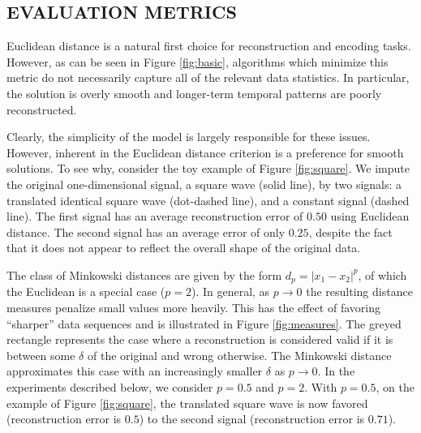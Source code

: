 \documentclass{article}
\newcommand{\FIXME}[2][FIXME]{\textcolor{blue}{\textbf{#1}: \emph{#2}}}
\begin{document}


\subsection{EVALUATION METRICS}
\label{ssec:measures}
Euclidean distance is a natural first choice for reconstruction and
encoding tasks. However, as can be seen in Figure \ref{fig:basic},
algorithms which minimize this metric do not necessarily capture all
of the relevant data statistics.  In particular, the solution is
overly smooth and longer-term temporal patterns are poorly
reconstructed.

Clearly, the simplicity of the model is largely responsible for these
issues.  However, inherent in the Euclidean distance criterion is a
preference for smooth solutions.
To see why, consider the toy example of Figure \ref{fig:square}. We
impute the original one-dimensional signal, a square wave (solid
line), by two signals: a translated identical square wave (dot-dashed
line), and a constant signal (dashed line). The first signal has an
average reconstruction error of $0.50$ using Euclidean distance. The
second signal has an average error of only $0.25$, despite the fact
that it does not appear to reflect the overall shape of the original
data.


The class of Minkowski distances are given by the form $d_p =
|x_1-x_2|^p$, of which the Euclidean is a special case ($p=2$).  In
general, as $p \rightarrow 0$ the resulting distance measures penalize
small values more heavily.  This has the effect of favoring
``sharper'' data sequences and is illustrated in Figure
\ref{fig:measures}.  The greyed rectangle represents the case where a
reconstruction is considered valid if it is between some $\delta$ of
the original and wrong otherwise.  The Minkowski distance approximates
this case with an increasingly smaller $\delta$ as $p \rightarrow 0$.
In the experiments described below, we consider $p=0.5$ and $p=2$.
With $p=0.5$, on the example of Figure \ref{fig:square}, the
translated square wave is now favored (reconstruction error is $0.5$)
to the second signal (reconstruction error is $0.71$).
\end{document}

